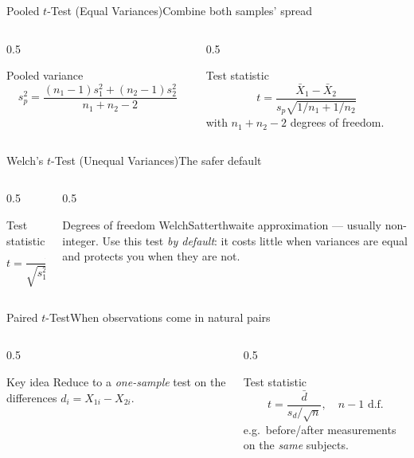 \documentclass[aspectratio=169,11pt]{beamer}
\begin{document}
\begin{frame}{Pooled $t$-Test (Equal Variances)}{Combine both samples' spread}
  \begin{columns}[T]
    \begin{column}{0.5\textwidth}
      \begin{block}{Pooled variance}
        \[ s_p^2 = \frac{(n_1-1)s_1^2+(n_2-1)s_2^2}{n_1+n_2-2} \]
      \end{block}
    \end{column}
    \begin{column}{0.5\textwidth}
      \begin{exampleblock}{Test statistic}
        \[ t = \frac{\bar X_1 - \bar X_2}{s_p\sqrt{1/n_1+1/n_2}} \]
        \small with $n_1+n_2-2$ degrees of freedom.
      \end{exampleblock}
    \end{column}
  \end{columns}
\end{frame}

\begin{frame}{Welch's $t$-Test (Unequal Variances)}{The safer default}
  \begin{columns}[T]
    \begin{column}{0.5\textwidth}
      \begin{block}{Test statistic}
        \[ t = \frac{\bar X_1-\bar X_2}{\sqrt{s_1^2/n_1 + s_2^2/n_2}} \]
      \end{block}
    \end{column}
    \begin{column}{0.5\textwidth}
      \begin{exampleblock}{Degrees of freedom}
        \small Welch\textendash Satterthwaite approximation — usually
        non-integer. Use this test \emph{by default}: it costs little when
        variances are equal and protects you when they are not.
      \end{exampleblock}
    \end{column}
  \end{columns}
\end{frame}

\begin{frame}{Paired $t$-Test}{When observations come in natural pairs}
  \begin{columns}[T]
    \begin{column}{0.5\textwidth}
      \begin{block}{Key idea}
        \small Reduce to a \emph{one-sample} test on the differences
        $d_i = X_{1i}-X_{2i}$.
      \end{block}
    \end{column}
    \begin{column}{0.5\textwidth}
      \begin{exampleblock}{Test statistic}
        \[ t = \frac{\bar d}{s_d/\sqrt n}, \quad n-1 \text{ d.f.} \]
        \small e.g.\ before/after measurements on the \emph{same} subjects.
      \end{exampleblock}
    \end{column}
  \end{columns}
\end{frame}
\end{document}
